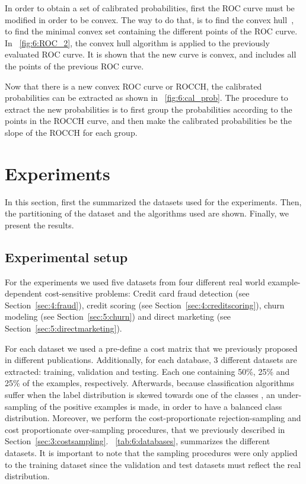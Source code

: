 In order to obtain a set of calibrated probabilities, first the ROC curve must be modified in 
order to be convex. The way to do that, is to find the convex \mbox{hull 
\citep{Hernandez-Orallo2012}}, to find the minimal convex set containing the different 
points of the ROC curve. In \figurename{~\ref{fig:6:ROC_2}}, the convex hull algorithm is applied 
to the previously evaluated ROC curve. It is shown that the new curve is convex, and includes all 
the points of the previous ROC curve.

Now that there is a new convex ROC curve or ROCCH, the calibrated probabilities can be extracted 
as shown in  \figurename{~\ref{fig:6:cal_prob}}. The procedure to extract the new probabilities is 
to first group the probabilities according to the points in the ROCCH curve, and then make the 
calibrated  probabilities be the slope of the ROCCH for each group.
  
   
\section{Experiments}
\label{sec:6:experiments}

In this section, first the summarized the datasets used for the experiments. Then, the 
partitioning of the dataset and the algorithms used are shown. Finally, we present the results.

\subsection{Experimental setup}

For the experiments we used five datasets from four different real world example-dependent 
cost-sensitive problems: Credit card fraud detection (see Section~\ref{sec:4:fraud}), credit 
scoring (see Section~\ref{sec:4:creditscoring}), churn modeling (see Section~\ref{sec:5:churn}) and 
direct marketing (see Section~\ref{sec:5:directmarketing}).

For each dataset we used a pre-define a cost matrix that we previously proposed in different 
publications. Additionally,  for each database, 3 different datasets are extracted: training, 
validation and testing. Each one containing 50\%, 25\% and 25\% of the examples, 
respectively. Afterwards, because classification algorithms suffer when the label distribution is 
skewed towards one of the classes \citep{Hastie2009}, an under-sampling of the positive examples is 
made, in order to have a balanced class distribution. Moreover, we perform the cost-proportionate 
rejection-sampling and cost proportionate over-sampling procedures, that we previously described in 
Section~\ref{sec:3:costsampling}. \tablename{~\ref{tab:6:databases}}, summarizes the 
different datasets. It is important to note that the sampling procedures were only applied to the 
training dataset since the validation and test datasets must reflect the real distribution.

